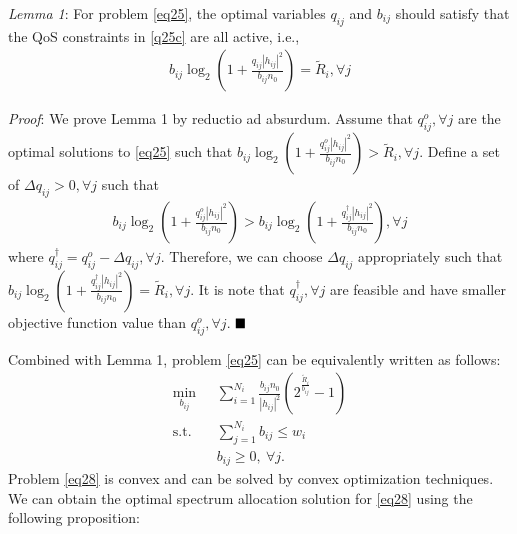 \documentclass[journal]{IEEEtran}
\begin{document}
\textit{Lemma 1}: For problem \eqref{eq25}, the optimal variables $q_{ij}$ and $b_{ij}$ should satisfy that the QoS constraints in \eqref{q25c} are all active, i.e., 
\begin{align} \label{q26}
b_{ij}\log_2\left(1 + \frac{q_{ij}\left|h_{ij}\right|^2}{b_{ij}n_0}\right) = \tilde{R}_i,  \forall j
\end{align}

\textit{Proof}:  
We prove Lemma 1 by reductio ad absurdum. Assume that $q_{ij}^o, \forall j$ are the optimal solutions to \eqref{eq25} such that $b_{ij}\log_2\left(1 + \frac{q_{ij}^o\left|h_{ij}\right|^2}{b_{ij}n_0}\right) > \tilde{R}_i, \forall j$. Define a set of $\Delta q_{ij} > 0, \forall j$ such that 
\begin{align}
b_{ij}\log_2\left(1 + \frac{q_{ij}^o\left|h_{ij}\right|^2}{b_{ij}n_0}\right) > b_{ij}\log_2\left(1 + \frac{q_{ij}^\dag\left|h_{ij}\right|^2}{b_{ij}n_0}\right), \forall j
\end{align}
where $q_{ij}^\dag = q_{ij}^o - \Delta q_{ij}, \forall j$. Therefore, we can choose $\Delta q_{ij}$ appropriately such that $b_{ij}\log_2\left(1 + \frac{q_{ij}^\dag\left|h_{ij}\right|^2}{b_{ij}n_0}\right) = \tilde{R}_i, \forall j$. It is note that $q_{ij}^\dag, \forall j$ are feasible and have smaller objective function value than $q_{ij}^o, \forall j$.
$\hfill\blacksquare$

Combined with Lemma 1, problem \eqref{eq25} can be equivalently written as follows:
\begin{subequations}\label{eq28}
	\begin{align}
	\min_{b_{ij}}\ & \sum\limits_{i = 1}^{N_i} \frac{b_{ij}n_0}{\left|h_{ij}\right|^2}\left(2^{\frac{\tilde{R}_i}{b_{ij}}} - 1\right) \label{q28a} \\ \mbox{s.t.} \quad &  \sum\limits_{j = 1}^{N_i} b_{ij} \leq w_i \label{q28b} \\
	& b_{ij} \geq 0, \ \forall j. \label{q14c}
	\end{align}
\end{subequations}
Problem \eqref{eq28} is convex and can be solved by convex optimization techniques. We can obtain the optimal spectrum allocation solution for \eqref{eq28} using the following proposition:
\end{document}
